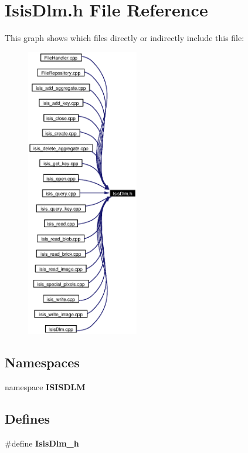 \section{Isis\-Dlm.h File Reference}
\label{IsisDlm_8h}


This graph shows which files directly or indirectly include this file:\begin{figure}[H]
\begin{center}
\leavevmode
\includegraphics[width=139pt]{IsisDlm_8h__dep__incl}
\end{center}
\end{figure}
\subsection*{Namespaces}
\begin{CompactItemize}
\item 
namespace {\bf ISISDLM}
\end{CompactItemize}
\subsection*{Defines}
\begin{CompactItemize}
\item 
\#define {\bf Isis\-Dlm\_\-h}
\end{CompactItemize}


